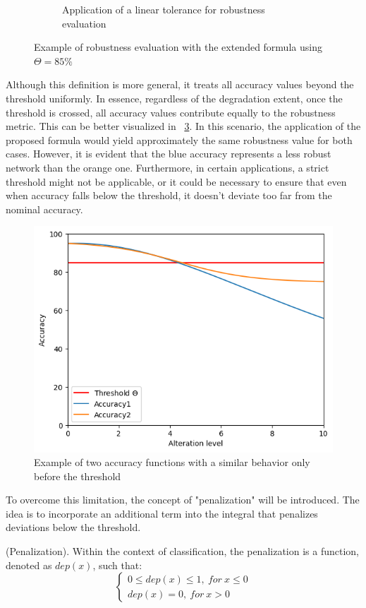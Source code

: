 \begin{figure}[h]
\begin{subfigure}{.5\textwidth}
		\caption{Application of a linear tolerance for robustness evaluation}
		\label{fig:rob1_lin_tol}
	\end{subfigure}
	\caption{Example of robustness evaluation with the extended formula using $\Theta=85\%$}
	\label{fig:rob1_tol}
\end{figure}

Although this definition is more general, it treats all accuracy values beyond the threshold uniformly. In essence, regardless of the degradation extent, once the threshold is crossed, all accuracy values contribute equally to the robustness metric. This can be better visualized in \Fig~\ref{fig:rob_problem_1}. In this scenario, the application of the proposed formula would yield approximately the same robustness value for both cases. However, it is evident that the blue accuracy represents a less robust network than the orange one. Furthermore, in certain applications, a strict threshold might not be applicable, or it could be necessary to ensure that even when accuracy falls below the threshold, it doesn't deviate too far from the nominal accuracy.

\begin{figure}[h]
	\centering
	\includegraphics[width=0.8\linewidth]{ImageFiles/ANNRob/rob_problem_1}
	\caption{Example of two accuracy functions with a similar behavior only before the threshold}
	\label{fig:rob_problem_1}
\end{figure}

To overcome this limitation, the concept of "penalization" will be introduced. The idea is to incorporate an additional term into the integral that penalizes deviations below the threshold.

\begin{definition} (Penalization).
	Within the context of classification, the penalization is a function, denoted as $dep(x)$, such that:
	\[
		\begin{cases}
			0 \le dep(x) \le 1 , \ for \ x \le 0\\
			dep(x) = 0, \ for \ x > 0
		\end{cases}	
	\]
\end{definition}

